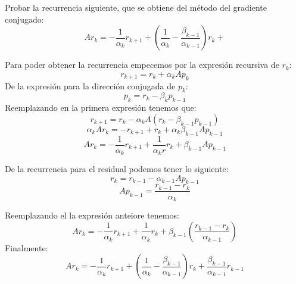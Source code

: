 Probar la recurrencia siguiente, que se obtiene del método del gradiente conjugado:\\

$$Ar_k = -\frac{1}{\alpha_k}r_{k+1}+(\frac{1}{\alpha_k}-\frac{\beta_{k-1}}{\alpha_{k-1}})r_k+$$

Para poder obtener la recurrencia empecemos por la expresión recursiva de $r_k$:\\
$$r_{k+1}=r_k+\alpha_kAp_k$$
De la expresión para la dirección conjugada de $p_k$:
$$p_k = r_k - \beta_kp_{k-1}$$
Reemplazando en la primera expresión tenemos que:
$$r_{k+1}=r_k-\alpha_kA(r_k-\beta_{k-1}p_{k-1})$$
$$\alpha_kAr_k=-r_{k+1}+r_k+\alpha_k\beta_{k-1}Ap_{k-1}$$
$$Ar_k=-\frac{1}{\alpha_k}r_{k+1}+\frac{1}{\alpha_kr}r_k+\beta_{k-1}Ap_{k-1}$$

De la recurrencia para el residual podemos tener lo siguiente:
$$r_{k}=r_{k-1}-\alpha_{k-1}Ap_{k-1}$$
$$Ap_{k-1}=\frac{r_{k-1}-r_k}{\alpha_{k}}$$

Reemplazando el la expresión anteiore tenemos:
$$Ar_{k}=-\frac{1}{\alpha_{k}}r_{k+1}+\frac{1}{\alpha_{k}}r_{k}+\beta_{k-1}(\frac{r_{k-1}-r_k}{\alpha_{k-1}})$$
Finalmente:
$$Ar_{k}=-\frac{1}{\alpha_{k}}r_{k+1}+(\frac{1}{\alpha_{k}}-\frac{\beta_{k-1}}{\alpha_{k-1}})r_k+\frac{\beta_{k-1}}{\alpha_{k-1}}r_{k-1}$$